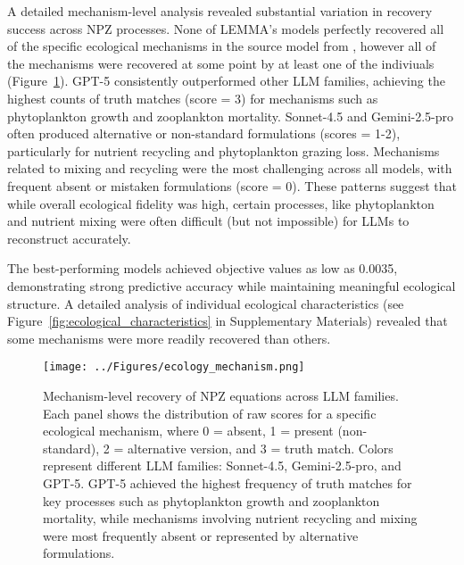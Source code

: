 A detailed mechanism-level analysis revealed substantial variation in recovery success across NPZ processes. None of LEMMA's models perfectly recovered all of the specific ecological mechanisms in the source model from \cite{edwards1999zooplankton}, however all of the mechanisms were recovered at some point by at least one of the indiviuals (Figure~\ref{fig:mechanism_recovery}). GPT-5 consistently outperformed other LLM families, achieving the highest counts of truth matches (score = 3) for mechanisms such as phytoplankton growth and zooplankton mortality. Sonnet-4.5 and Gemini-2.5-pro often produced alternative or non-standard formulations (scores = 1-2), particularly for nutrient recycling and phytoplankton grazing loss. Mechanisms related to mixing and recycling were the most challenging across all models, with frequent absent or mistaken formulations (score = 0). These patterns suggest that while overall ecological fidelity was high, certain processes, like phytoplankton and nutrient mixing were often difficult (but not impossible) for LLMs to reconstruct accurately.

The best-performing models achieved objective values as low as 0.0035, demonstrating strong predictive accuracy while maintaining meaningful ecological structure. A detailed analysis of individual ecological characteristics (see Figure~\ref{fig:ecological_characteristics} in Supplementary Materials) revealed that some mechanisms were more readily recovered than others.

\begin{figure}[H]
\centering
\texttt{[image: ../Figures/ecology\_mechanism.png]}
\caption{Mechanism-level recovery of NPZ equations across LLM families. Each panel shows the distribution of raw scores for a specific ecological mechanism, where 0 = absent, 1 = present (non-standard), 2 = alternative version, and 3 = truth match. Colors represent different LLM families: Sonnet-4.5, Gemini-2.5-pro, and GPT-5. GPT-5 achieved the highest frequency of truth matches for key processes such as phytoplankton growth and zooplankton mortality, while mechanisms involving nutrient recycling and mixing were most frequently absent or represented by alternative formulations.}
\label{fig:mechanism_recovery}
\end{figure}

